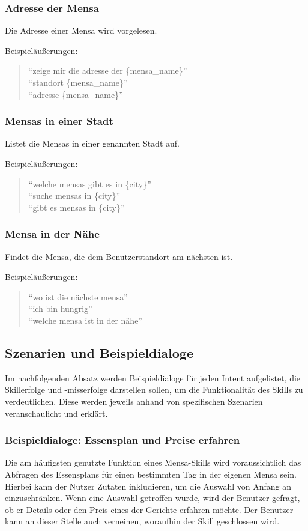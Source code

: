 \documentclass[12pt]{article}
\begin{document}
\subsubsection{Adresse der Mensa}
Die Adresse einer Mensa wird vorgelesen. 

Beispieläußerungen:
\begin{quote}
“zeige mir die adresse der \{mensa\_name\}”\\
“standort \{mensa\_name\}”\\
“adresse \{mensa\_name\}”\\
\end{quote}

\subsubsection{Mensas in einer Stadt}
Listet die Mensas in einer genannten Stadt auf.

Beispieläußerungen:
\begin{quote}
“welche mensas gibt es in \{city\}”\\
“suche mensas in \{city\}”\\
“gibt es mensas in \{city\}”\\
\end{quote}

\subsubsection{Mensa in der Nähe}
Findet die Mensa, die dem Benutzerstandort am nächsten ist.

Beispieläußerungen:
\begin{quote}
“wo ist die nächste mensa”\\
“ich bin hungrig”\\
“welche mensa ist in der nähe”\\
\end{quote}

\subsection{Szenarien und Beispieldialoge}
Im nachfolgenden Absatz werden Beispieldialoge für jeden Intent aufgelistet, die Skillerfolge und -misserfolge darstellen sollen, um die Funktionalität des Skills zu verdeutlichen.
Diese werden jeweils anhand von spezifischen Szenarien veranschaulicht und erklärt.

\subsubsection{Beispieldialoge: Essensplan und Preise erfahren}
Die am häufigsten genutzte Funktion eines Mensa-Skills wird voraussichtlich das Abfragen des Essensplans für einen bestimmten Tag in der eigenen Mensa sein. 
Hierbei kann der Nutzer Zutaten inkludieren, um die Auswahl von Anfang an einzuschränken.
Wenn eine Auswahl getroffen wurde, wird der Benutzer gefragt, ob er Details oder den Preis eines der Gerichte erfahren möchte.
Der Benutzer kann an dieser Stelle auch verneinen, woraufhin der Skill geschlossen wird.
\end{document}
